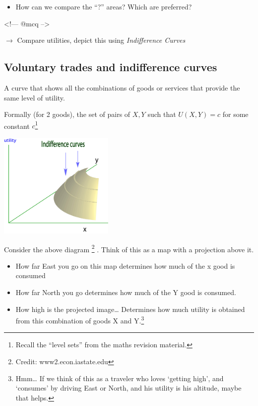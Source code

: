 \documentclass[]{article}
\providecommand{\tightlist}{%
  \setlength{\itemsep}{0pt}\setlength{\parskip}{0pt}}
\begin{document}
\begin{itemize}
\tightlist
\item
  How can we compare the ``?'' areas? Which are preferred?
\end{itemize}

\textless!--- @mcq --\textgreater{}

\(\rightarrow\) Compare utilities, depict this using \emph{Indifference
Curves}

\hypertarget{voluntary-trades-and-indifference-curves}{%
\subsection{Voluntary trades and indifference
curves}\label{voluntary-trades-and-indifference-curves}}

\begin{description}
\tightlist
\item[Indifference curve]
A curve that shows all the combinations of goods or services that
provide the same level of utility.
\end{description}

\medskip

Formally (for 2 goods), the set of pairs of \({X,Y}\) such that
\(U(X,Y)=c\) for some constant \(c\)\footnote{Recall the ``level sets''
  from the maths revision material.}

\includegraphics[height=2in]{picsfigs/indifcurves_util_together.jpg}

Consider the above diagram \footnote{Credit: www2.econ.iastate.edu} .
Think of this as a map with a projection above it.

\begin{itemize}
\item
  How far East you go on this map determines how much of the x good is
  consumed
\item
  How far North you go determines how much of the Y good is consumed.
\item
  How high is the projected image\ldots{} Determines how much utility is
  obtained from this combination of goods X and Y.\footnote{Hmm\ldots{}
    If we think of this as a traveler who loves `getting high', and
    `consumes' by driving East or North, and his utility is his
    altitude, maybe that helps.}
\end{itemize}
\end{document}
